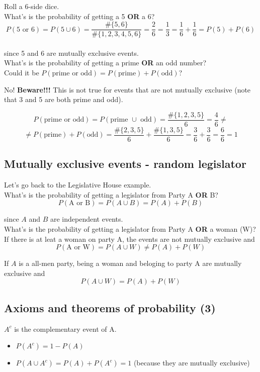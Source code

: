 \documentclass[11pt]{article}
\begin{document}
	Roll a 6-side dice.\\
	
	What's is the probability of getting a 5 \textbf{OR} a 6?\\
	\[P(\text{5 or 6}) = P(5 \cup 6) = \frac{\#\{5, 6\}}{\#\{1, 2, 3, 4, 5, 6\}} = \frac{2}{6} = \frac{1}{3} = \frac{1}{6} + \frac{1}{6} = P(5) + P(6)\]\\ 
	since 5 and 6 are mutually exclusive events.\\
	
	What's is the probability of getting a prime \textbf{OR} an odd number?\\

	Could it be $P(\text{prime or odd}) =  P(\text{prime}) + P(\text{odd})$?

	No! \textbf{Beware!!!} This is not true for events that are not mutually exclusive (note that 3 and 5 are both prime and odd).

	\[P(\text{prime or odd}) = P(\text{prime }\cup\text{ odd}) = \frac{\#\{1, 2, 3, 5\}}{6} = \frac{4}{6} \neq \]
	\[ \neq P(\text{prime}) + P(\text{odd}) = \frac{\#\{2, 3, 5\}}{6} + \frac{\#\{1, 3, 5\}}{6} = \frac{3}{6} + \frac{3}{6} = \frac{6}{6} = 1\]

	\subsection*{Mutually exclusive events - random legislator}
	
	Let's go back to the Legislative House example.\\
	
	What's is the probability of getting a legislator from Party A \textbf{OR} B?
	\[P(\text{A or B}) = P(A \cup B) = P(A) + P(B)\]
	
	since $A$ and $B$ are independent events.\\
	
	What's is the probability of getting a legislator from Party A \textbf{OR} a woman (W)?\\
	
	If there is at leat a woman on party A, the events are not mutually exclusive and \[P(\text{A or W}) = P(A \cup W) \neq P(A) + P(W)\]
	
	If $A$ is a all-men party, being a woman and beloging to party A are mutually exclusive and
	\[P(A \cup W) = P(A) + P(W)\]


	\subsection*{Axioms and theorems of probability (3)}
	$A^c$ is the complementary event of A.
	\begin{itemize}
		\item  $P(A^c) = 1 - P(A)$
		\item  $P(A \cup A^c) = P(A) + P(A^c) = 1$ (because they are mutually exclusive)
	\end{itemize}
\end{document}
